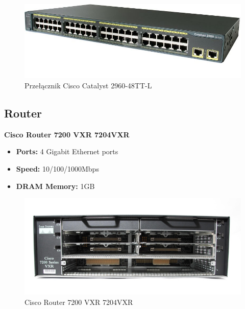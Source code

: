 \begin{figure}[htbp]
	\begin{center}
        \includegraphics[scale = 0.6]{img/switchL2.jpg}
        \caption{Przełącznik Cisco Catalyst 2960-48TT-L}
    \end{center}
\end{figure}

\newpage

 \subsection{Router}
 \textbf{Cisco Router 7200 VXR 7204VXR}
 \begin{itemize}
  	\item \textbf{Ports:} 4 Gigabit Ethernet ports
  	\item \textbf{Speed:} 10/100/1000Mbps
  	\item \textbf{DRAM Memory:} 1GB 
 \end{itemize}
 \begin{figure}[htbp]
	\begin{center}
        \includegraphics[scale = 0.6]{img/router.jpg}
        \caption{Cisco Router 7200 VXR 7204VXR}
    \end{center}
\end{figure}


\newpage
